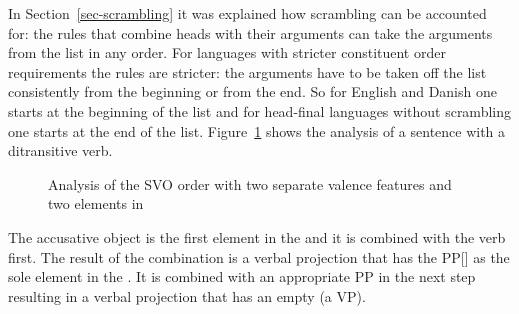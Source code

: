In Section~\ref{sec-scrambling} it was explained how scrambling can be accounted for: the rules that
combine heads with their arguments can take the arguments from the list in any order. For languages
with stricter constituent order requirements the rules are stricter: the arguments have to be taken
off the list consistently from the beginning or from the end. So for English and Danish one starts
at the beginning of the list and for head-final languages without scrambling one starts at the end
of the list. Figure~\ref{fig-svo-ditrans} shows the analysis of a sentence with a ditransitive verb.
\begin{figure}
\caption{\label{fig-svo-ditrans}Analysis of the SVO order with two separate valence features and two
  elements in \comps}
\end{figure}
The accusative object is the first element in the \compsl and it is combined with the verb
first. The result of the combination is a verbal projection that has the PP[] as the sole
element in the \compsl. It is combined with an appropriate PP in the next step resulting in a verbal
projection that has an empty \compsl (a VP).


